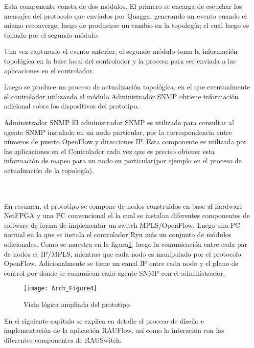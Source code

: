 Esta componente consta de dos módulos. El primero se encarga de escuchar los mensajes del protocolo que enviados por Quagga, generando un evento cuando el mismo reconverge, luego de producirse un cambio en la topolog\'ia; el cual luego es tomado por el segundo m\'odulo.

Una vez capturado el evento anterior, el segundo m\'odulo toma la información topol\'ogica en la base local del controlador y la procesa para ser enviada a las aplicaciones en el controlador.

Luego se produce un proceso de actualizaci\'on topol\'ogica, en el que eventualmente el controlador utilizando el m\'odulo Administrador SNMP obtiene informaci\'on adicional sobre los dispositivos del prototipo. 

\begin{subsection}{Administrador SNMP}
El administrador SNMP es utilizado para consultar al agente SNMP instalado en un nodo particular, por la correspondencia entre números de puerto OpenFlow y direcciones IP. Esta componente es utilizada por las aplicaciones en el Controlador cada vez que es preciso obtener esta información de mapeo para un nodo en particular(por ejemplo en el proceso de actualización de la topolog\'ia).\\\\\

\end{subsection}

En resumen, el prototipo se compone de nodos construidos en base al hardware NetFPGA y una PC convencional el la cual se instalan diferentes componentes de software de forma de implementar un switch MPLS/OpenFlow. Luego una PC normal en la que se instala el controlador Ryu m\'as un conjunto de m\'odulos adicionales. Como se muestra en la figura\ref{fig:OpenSourceRArch4}, luego la comunicación entre cada par de nodos es IP/MPLS, mientras que cada nodo es manipulado por el protocolo OpenFlow. Adicionalmente se tiene un canal IP entre cada nodo y el plano de control por donde se comunican cada agente SNMP con el administrador.

\newpage
\begin{figure}[Ht!] 
\centering    
\texttt{[image: Arch\_Figure4]}
\caption[Vista l\'ogica ampliada del prototipo]{Vista l\'ogica ampliada del prototipo}
\label{fig:OpenSourceRArch4}
\end{figure}

En el siguiente cap\'itulo se explica en detalle el proceso de diseño e implementaci\'on de la aplicaci\'on RAUFlow, as\'i como la interaci\'on con las diferentes componentes de RAUSwitch.

